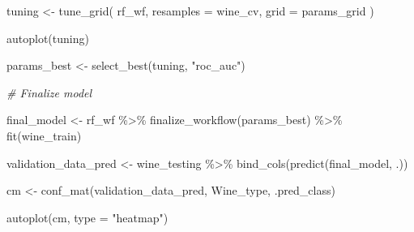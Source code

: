 \documentclass[
]{book}
\newenvironment{Shaded}{\begin{snugshade}}{\end{snugshade}}
\newcommand{\AttributeTok}[1]{\textcolor[rgb]{0.77,0.63,0.00}{#1}}
\newcommand{\CommentTok}[1]{\textcolor[rgb]{0.56,0.35,0.01}{\textit{#1}}}
\newcommand{\FunctionTok}[1]{\textcolor[rgb]{0.00,0.00,0.00}{#1}}
\newcommand{\NormalTok}[1]{#1}
\newcommand{\OtherTok}[1]{\textcolor[rgb]{0.56,0.35,0.01}{#1}}
\newcommand{\SpecialCharTok}[1]{\textcolor[rgb]{0.00,0.00,0.00}{#1}}
\newcommand{\StringTok}[1]{\textcolor[rgb]{0.31,0.60,0.02}{#1}}
\begin{document}
\begin{Shaded}
\begin{Highlighting}[]
\NormalTok{tuning }\OtherTok{\textless{}{-}} \FunctionTok{tune\_grid}\NormalTok{(}
\NormalTok{  rf\_wf,}
  \AttributeTok{resamples =}\NormalTok{ wine\_cv,}
  \AttributeTok{grid =}\NormalTok{ params\_grid}
\NormalTok{)}

\FunctionTok{autoplot}\NormalTok{(tuning)}

\NormalTok{params\_best }\OtherTok{\textless{}{-}} \FunctionTok{select\_best}\NormalTok{(tuning, }\StringTok{"roc\_auc"}\NormalTok{)}

\CommentTok{\# Finalize model }

\NormalTok{final\_model }\OtherTok{\textless{}{-}}\NormalTok{ rf\_wf }\SpecialCharTok{\%\textgreater{}\%}
  \FunctionTok{finalize\_workflow}\NormalTok{(params\_best) }\SpecialCharTok{\%\textgreater{}\%}
  \FunctionTok{fit}\NormalTok{(wine\_train)}

\NormalTok{validation\_data\_pred }\OtherTok{\textless{}{-}}\NormalTok{ wine\_testing }\SpecialCharTok{\%\textgreater{}\%}
  \FunctionTok{bind\_cols}\NormalTok{(}\FunctionTok{predict}\NormalTok{(final\_model, .))}

\NormalTok{cm }\OtherTok{\textless{}{-}} \FunctionTok{conf\_mat}\NormalTok{(validation\_data\_pred, Wine\_type, .pred\_class)}

\FunctionTok{autoplot}\NormalTok{(cm, }\AttributeTok{type =} \StringTok{"heatmap"}\NormalTok{)}
\end{Highlighting}
\end{Shaded}
\end{document}
